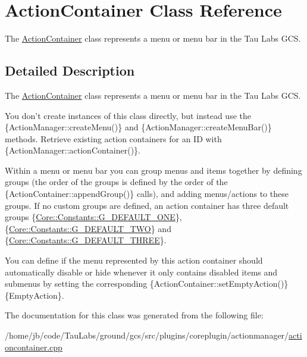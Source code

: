 \hypertarget{class_action_container}{\section{\-Action\-Container \-Class \-Reference}
\label{class_action_container}
}


\-The \hyperlink{class_action_container}{\-Action\-Container} class represents a menu or menu bar in the \-Tau \-Labs \-G\-C\-S.  




\subsection{\-Detailed \-Description}
\-The \hyperlink{class_action_container}{\-Action\-Container} class represents a menu or menu bar in the \-Tau \-Labs \-G\-C\-S. 

\-You don't create instances of this class directly, but instead use the \{\-Action\-Manager\-::create\-Menu()\} and \{\-Action\-Manager\-::create\-Menu\-Bar()\} methods. \-Retrieve existing action containers for an \-I\-D with \{\-Action\-Manager\-::action\-Container()\}.

\-Within a menu or menu bar you can group menus and items together by defining groups (the order of the groups is defined by the order of the \{\-Action\-Container\-::append\-Group()\} calls), and adding menus/actions to these groups. \-If no custom groups are defined, an action container has three default groups {\ttfamily }\{\hyperlink{group___core_plugin_ga522e575966eb8fe2374da35aac3e7d69}{\-Core\-::\-Constants\-::\-G\-\_\-\-D\-E\-F\-A\-U\-L\-T\-\_\-\-O\-N\-E}\}, {\ttfamily }\{\hyperlink{group___core_plugin_ga4f77e1e87898edaae0fa296fdab5806d}{\-Core\-::\-Constants\-::\-G\-\_\-\-D\-E\-F\-A\-U\-L\-T\-\_\-\-T\-W\-O}\} and {\ttfamily }\{\hyperlink{group___core_plugin_gaa9d110a5d72f47a9f4893a54bebdef9d}{\-Core\-::\-Constants\-::\-G\-\_\-\-D\-E\-F\-A\-U\-L\-T\-\_\-\-T\-H\-R\-E\-E}\}.

\-You can define if the menu represented by this action container should automatically disable or hide whenever it only contains disabled items and submenus by setting the corresponding \{\-Action\-Container\-::set\-Empty\-Action()\}\{\-Empty\-Action\}. 

\-The documentation for this class was generated from the following file\-:\begin{DoxyCompactItemize}
\item 
/home/jb/code/\-Tau\-Labs/ground/gcs/src/plugins/coreplugin/actionmanager/\hyperlink{actioncontainer_8cpp}{actioncontainer.\-cpp}\end{DoxyCompactItemize}
